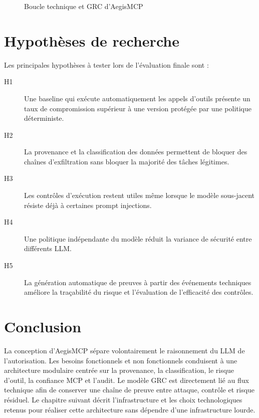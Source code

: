 \begin{figure}[H]
\centering
{}
\caption{Boucle technique et GRC d'AegisMCP}
\label{fig:grc-loop}
\end{figure}

\section{Hypothèses de recherche}

Les principales hypothèses à tester lors de l'évaluation finale sont :

\begin{description}
    \item[H1] Une baseline qui exécute automatiquement les appels d'outils présente un taux de compromission supérieur à une version protégée par une politique déterministe.
    \item[H2] La provenance et la classification des données permettent de bloquer des chaînes d'exfiltration sans bloquer la majorité des tâches légitimes.
    \item[H3] Les contrôles d'exécution restent utiles même lorsque le modèle sous-jacent résiste déjà à certaines prompt injections.
    \item[H4] Une politique indépendante du modèle réduit la variance de sécurité entre différents LLM.
    \item[H5] La génération automatique de preuves à partir des événements techniques améliore la traçabilité du risque et l'évaluation de l'efficacité des contrôles.
\end{description}

\section*{Conclusion}

La conception d'AegisMCP sépare volontairement le raisonnement du LLM de l'autorisation. Les besoins fonctionnels et non fonctionnels conduisent à une architecture modulaire centrée sur la provenance, la classification, le risque d'outil, la confiance MCP et l'audit. Le modèle GRC est directement lié au flux technique afin de conserver une chaîne de preuve entre attaque, contrôle et risque résiduel. Le chapitre suivant décrit l'infrastructure et les choix technologiques retenus pour réaliser cette architecture sans dépendre d'une infrastructure lourde.
